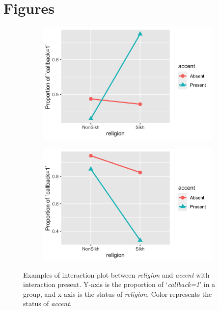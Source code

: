 \documentclass[11pt]{article}
\begin{document}
\section{Figures}
\setcounter{figure}{0} 
\begin{figure}[!h]
    \centering
    \begin{subfigure}{0.45\textwidth}
        \centering
        \includegraphics[width=\textwidth]{../../Plots/Interaction_accent_religion_negative.png}
    \end{subfigure}
    \begin{subfigure}{0.45\textwidth}
        \centering
        \includegraphics[width=\textwidth]{../../Plots/Interaction_accent_religion_positive.png}
    \end{subfigure}
    \caption{Examples of interaction plot between \textit{religion} and \textit{accent} with interaction present. Y-axis is the proportion of `\textit{callback=1}' in a group, and x-axis is the status of \textit{religion}. Color represents the status of \textit{accent}.}
    \label{fig:interact2}
\end{figure}

\clearpage
\begin{singlespace}
\raggedright
%

\end{singlespace}
\end{document}
